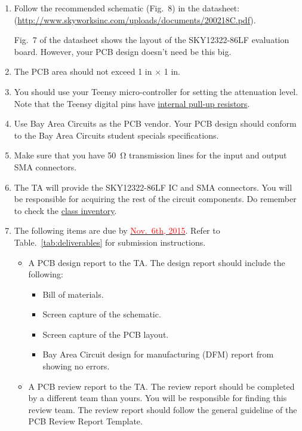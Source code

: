 \documentclass[letterpaper, 11pt]{article}
\newcommand{\due}[1]{\href{https://github.com/ucdart/UCD-EEC134/blob/master/support/schedule/eec134-schedule.pdf}{\textcolor{red}{#1}}}
\begin{document}
\begin{enumerate}
	\item Follow the recommended schematic (Fig.~8) in the datasheet:\\ (\url{http://www.skyworksinc.com/uploads/documents/200218C.pdf}). 
	
	Fig.~7 of the datasheet shows the layout of the SKY12322-86LF evaluation board. However, your PCB design doesn't need be this big.

	\item The PCB area should not exceed 1 in $\times$ 1 in.	

	\item You should use your Teensy micro-controller for setting the attenuation level. Note that the Teensy digital pins have \href{https://www.pjrc.com/teensy/td_digital.html}{internal pull-up resistors}. 
	
	\item Use Bay Area Circuits as the PCB vendor. Your PCB design should conform to the Bay Area Circuits student specials specifications. 
	
	\item Make sure that you have \SI{50}{\ohm} transmission lines for the input and output SMA connectors.
	
	\item The TA will provide the SKY12322-86LF IC and SMA connectors. You will be responsible for acquiring the rest of the circuit components. Do remember to check the \href{https://docs.google.com/spreadsheets/d/1GJnBLUymuVzXjrK0Zkdbc2lwTbw0z9a0JR4bLLzO-Sw/edit#gid=4}{class inventory}. 
	
	\item The following items are due by \due{Nov.~6th, 2015}. Refer to Table.~\ref{tab:deliverables} for submission instructions. 
		\begin{itemize}
			\item A PCB design report to the TA. The design report should include the following:
				\begin{itemize}
					\item Bill of materials.
					\item Screen capture of the schematic.
					\item Screen capture of the PCB layout.
					\item Bay Area Circuit design for manufacturing (DFM) report from showing no errors.
				\end{itemize}
			\item A PCB review report to the TA. The review report should be completed by a different team than yours. You will be responsible for finding this review team. The review report should follow the general guideline of the PCB Review Report Template.
			

\end{itemize}
\end{enumerate}
\end{document}
